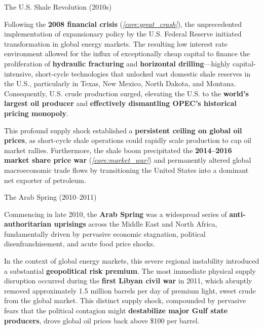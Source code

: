 \documentclass[10pt]{article}
\begin{document}
      \begin{core}[label=core:shale]{The U.S. Shale Revolution (2010s)}

        Following the \textbf{2008 financial crisis} (\textit{\autoref{core:great_crash}}), the unprecedented implementation of expansionary policy by the U.S. Federal Reserve initiated transformation in global energy markets. The resulting low interest rate environment allowed for the influx of exceptionally cheap capital to finance the proliferation of \textbf{hydraulic fracturing} and \textbf{horizontal drilling}---highly capital-intensive, short-cycle technologies that unlocked vast domestic shale reserves in the U.S., particularly in Texas, New Mexico, North Dakota, and Montana. Consequently, U.S. crude production surged, elevating the U.S. to the \textbf{world's largest oil producer} and \textbf{effectively dismantling OPEC's historical pricing monopoly}.


        This profound supply shock established a \textbf{persistent ceiling on global oil prices}, as short-cycle shale operations could rapidly scale production to cap oil market rallies. Furthermore, the shale boom precipitated the \textbf{2014--2016 market share price war} (\textit{\autoref{core:market_war}}) and permanently altered global macroeconomic trade flows by transitioning the United States into a dominant net exporter of petroleum.

      \end{core}

      \begin{core}[label=core:arab_spring]{The Arab Spring (2010--2011)}

        Commencing in late 2010, the \textbf{Arab Spring} was a widespread series of \textbf{anti-authoritarian uprisings} across the Middle East and North Africa, fundamentally driven by pervasive economic stagnation, political disenfranchisement, and acute food price shocks.


        In the context of global energy markets, this severe regional instability introduced a substantial \textbf{geopolitical risk premium}. The most immediate physical supply disruption occurred during the \textbf{first Libyan civil war} in 2011, which abruptly removed approximately 1.5 million barrels per day of premium light, sweet crude from the global market. This distinct supply shock, compounded by pervasive fears that the political contagion might \textbf{destabilize major Gulf state producers}, drove global oil prices back above \$100 per barrel.

      \end{core}
\end{document}
